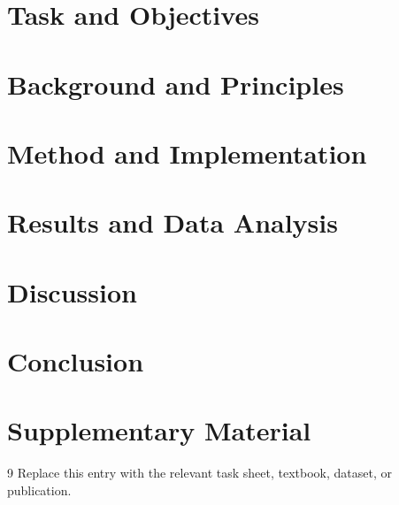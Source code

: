 \documentclass[11pt,a4paper]{article}
\begin{document}
\LabMakeCover
\LabBeginMain

\begin{abstract}
\noindent
{}
\end{abstract}

\section{Task and Objectives}


\section{Background and Principles}


\section{Method and Implementation}


\section{Results and Data Analysis}


\section{Discussion}


\section{Conclusion}


\appendix
\section{Supplementary Material}


\begin{thebibliography}{9}
\footnotesize
{}
Replace this entry with the relevant task sheet, textbook, dataset, or publication.
\end{thebibliography}
\end{document}
